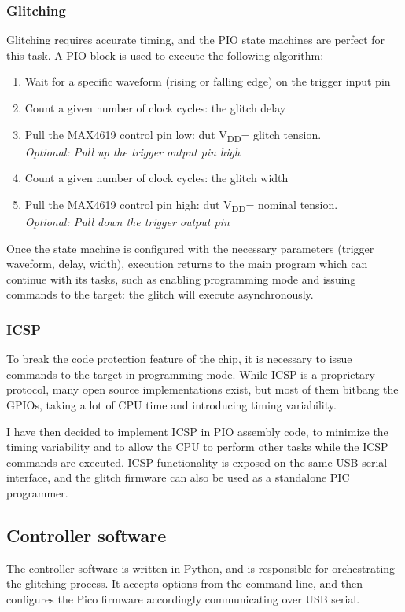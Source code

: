 \documentclass[a4paper,english,twoside,10pt]{article}
\newcommand{\vdd}{V\textsubscript{DD}}
\begin{document}
\subsubsection{Glitching}
Glitching requires accurate timing, and the PIO state machines are perfect for this task. A PIO block is used to execute the following algorithm:
\begin{enumerate}
	\item Wait for a specific waveform (rising or falling edge) on the trigger input pin
	\item Count a given number of clock cycles: the glitch delay
	\item Pull the MAX4619 control pin low: \gls{dut} \vdd = glitch tension.\\
		  \textit{Optional: Pull up the trigger output pin high}
	\item Count a given number of clock cycles: the glitch width
	\item Pull the MAX4619 control pin high: \gls{dut} \vdd = nominal tension.\\
		  \textit{Optional: Pull down the trigger output pin}
\end{enumerate}

Once the state machine is configured with the necessary parameters (trigger waveform, delay, width), execution returns to the main program which can continue with its tasks, such as enabling programming mode and issuing commands to the target: the glitch will execute asynchronously.

\subsubsection{ICSP}\label{sect:icsp}
To break the code protection feature of the chip, it is necessary to issue commands to the target in programming mode. While ICSP is a proprietary protocol, many open source implementations exist, but most of them bitbang the GPIOs, taking a lot of CPU time and introducing timing variability.

I have then decided to implement ICSP in PIO assembly code, to minimize the timing variability and to allow the CPU to perform other tasks while the ICSP commands are executed. ICSP functionality is exposed on the same USB serial interface, and the glitch firmware can also be used as a standalone PIC programmer.

\subsection{Controller software}
The controller software is written in Python, and is responsible for orchestrating the glitching process. It accepts options from the command line, and then configures the Pico firmware accordingly communicating over USB serial.
\end{document}

